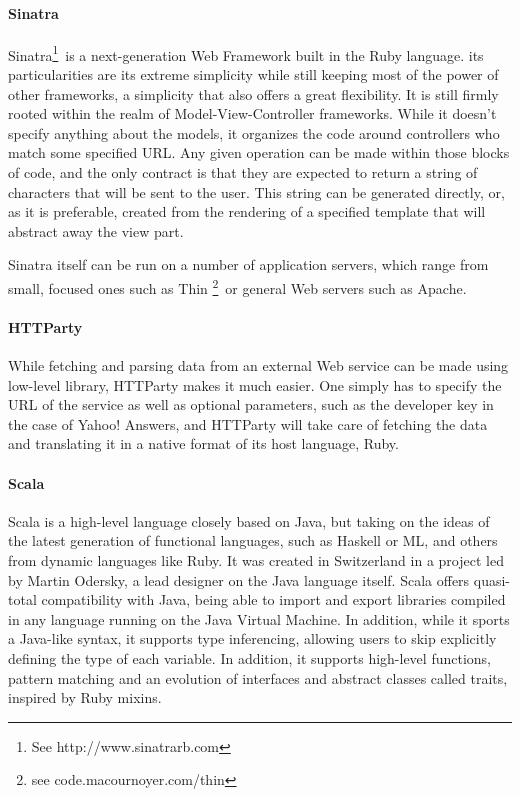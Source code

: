 
\paragraph{Sinatra} %
\label{par:sinatra}

Sinatra\footnote{See http://www.sinatrarb.com}\ is a next-generation Web Framework built in the Ruby language. its particularities are its extreme simplicity while still keeping most of the power of other frameworks, a simplicity that also offers a great flexibility. It is still firmly rooted within the realm of Model-View-Controller frameworks. While it doesn't specify anything about the models, it organizes the code around controllers who match some specified URL. Any given operation can be made within those blocks of code, and the only contract is that they are expected to return a string of characters that will be sent to the user. This string can be generated directly, or, as it is preferable, created from the rendering of a specified template that will abstract away the view part.

Sinatra itself can be run on a number of application servers, which range from small, focused ones such as Thin \footnote{see code.macournoyer.com/thin}\ or general Web servers such as Apache.


\paragraph{HTTParty} %
\label{par:httparty}

While fetching and parsing data from an external Web service can be made using low-level library, HTTParty makes it much easier. One simply has to specify the URL of the service as well as optional parameters, such as the developer key in the case of Yahoo! Answers, and HTTParty will take care of fetching the data and translating it in a native format of its host language, Ruby.


\paragraph{Scala} %
\label{par:scala}

Scala is a high-level language closely based on Java, but taking on the ideas of the latest generation of functional languages, such as Haskell or ML, and others from dynamic languages like Ruby. It was created in Switzerland in a project led by Martin Odersky, a lead designer on the Java language itself. Scala offers quasi-total compatibility with Java, being able to import and export libraries compiled in any language running on the Java Virtual Machine. In addition, while it sports a Java-like syntax, it supports type inferencing, allowing users to skip explicitly defining the type of each variable. In addition, it supports high-level functions, pattern matching and an evolution of interfaces and abstract classes called traits, inspired by Ruby mixins.

